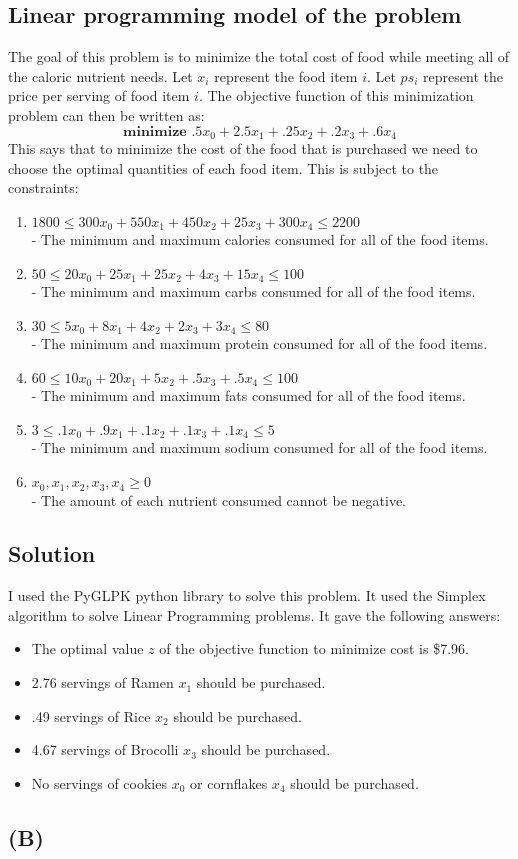 \documentclass[12pt]{article}
\begin{document}
\subsection*{Linear programming model of the problem}
The goal of this problem is to minimize the total cost of food while meeting all of the caloric nutrient needs.  Let $x_{i}$ represent the food item $i$.  Let $ps_{i}$ represent the price per serving of food item $i$.  The objective function of this minimization problem can then be written as:
$$
  \textbf{minimize } .5x_{0} + 2.5x_{1} + .25x_{2} + .2x_{3} + .6x_{4}
$$
This says that to minimize the cost of the food that is purchased we need to choose the optimal quantities of each food item.  This is subject to the constraints:
\begin{enumerate}
\itemsep0em
  \item $1800 \leq 300x_{0} + 550x_{1} + 450x_{2} + 25x_{3} + 300x_{4} \leq 2200$\\
  - The minimum and maximum calories consumed for all of the food items.
  \item $50 \leq 20x_{0} + 25x_{1} + 25x_{2} + 4x_{3} + 15x_{4} \leq 100$\\
  - The minimum and maximum carbs consumed for all of the food items.
  \item $30 \leq 5x_{0} + 8x_{1} + 4x_{2} + 2x_{3} + 3x_{4} \leq 80$\\
  - The minimum and maximum protein consumed for all of the food items.
  \item $60 \leq 10x_{0} + 20x_{1} + 5x_{2} + .5x_{3} + .5x_{4} \leq 100$\\
  - The minimum and maximum fats consumed for all of the food items.
  \item $3 \leq .1x_{0} + .9x_{1} + .1x_{2} + .1x_{3} + .1x_{4} \leq 5$\\
  - The minimum and maximum sodium consumed for all of the food items.
  \item $x_{0}, x_{1}, x_{2}, x_{3}, x_{4} \geq 0$\\
  - The amount of each nutrient consumed cannot be negative.
\end{enumerate}

\subsection*{Solution}
I used the PyGLPK python library to solve this problem.  It used the Simplex algorithm to solve Linear Programming problems.  It gave the following answers:
\begin{itemize}
  \item The optimal value $z$ of the objective function to minimize cost is \$7.96.
  \item 2.76 servings of Ramen $x_{1}$ should be purchased.
  \item .49 servings of Rice $x_{2}$ should be purchased.
  \item 4.67 servings of Brocolli $x_{3}$ should be purchased.
  \item No servings of cookies $x_{0}$ or cornflakes $x_{4}$ should be purchased.
\end{itemize}

\subsection*{(B)}


\newpage




\end{document}
